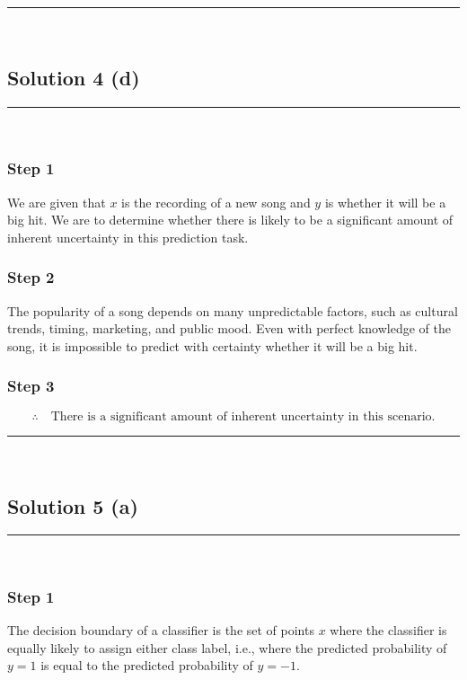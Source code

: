 \documentclass{article}
\begin{document}
\noindent\rule{\textwidth}{0.4pt}\\

\newpage

\subsection*{Solution 4 (d)}
\noindent\rule{\textwidth}{0.4pt}\\

\subsubsection*{Step 1}
\parbox{\textwidth}{
We are given that $x$ is the recording of a new song and $y$ is whether it will be a big hit. We are to determine whether there is likely to be a significant amount of inherent uncertainty in this prediction task.
}

\subsubsection*{Step 2}
\parbox{\textwidth}{
The popularity of a song depends on many unpredictable factors, such as cultural trends, timing, marketing, and public mood. Even with perfect knowledge of the song, it is impossible to predict with certainty whether it will be a big hit.
}

\subsubsection*{Step 3}
\parbox{\textwidth}{
\[
\therefore \quad \text{There is a significant amount of inherent uncertainty in this scenario.}
\]
}

\noindent\rule{\textwidth}{0.4pt}\\

\newpage

\subsection*{Solution 5 (a)}
\noindent\rule{\textwidth}{0.4pt}\\

\subsubsection*{Step 1}
\parbox{\textwidth}{
The decision boundary of a classifier is the set of points $x$ where the classifier is equally likely to assign either class label, i.e., where the predicted probability of $y=1$ is equal to the predicted probability of $y=-1$.
}
\end{document}
